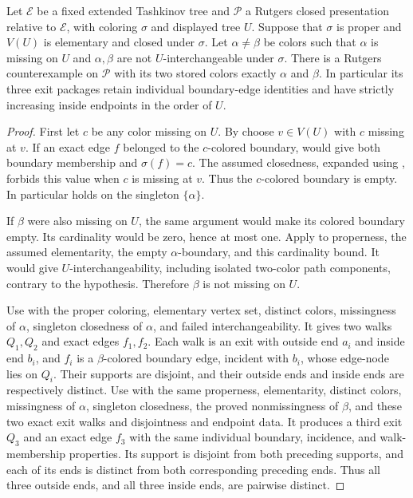 \begin{lemma}
Let $\mathcal E$ be a fixed extended Tashkinov tree and $\mathcal P$ a
Rutgers closed presentation relative to $\mathcal E$, with coloring
$\sigma$ and displayed tree $U$. Suppose that $\sigma$ is proper and
$V(U)$ is elementary and closed under $\sigma$. Let $\alpha\ne\beta$
be colors such that $\alpha$ is missing on $U$ and $\alpha,\beta$ are
not $U$-interchangeable under $\sigma$. There is a Rutgers counterexample
on $\mathcal P$ with its two stored colors exactly $\alpha$ and $\beta$.
In particular its three exit packages retain individual boundary-edge
identities and have strictly increasing inside endpoints in the order of
$U$.
\end{lemma}
\begin{proof}
First let $c$ be any color missing on $U$. By 
choose $v\in V(U)$ with $c$ missing at $v$. If an exact edge $f$ belonged
to the $c$-colored boundary,  would give both
boundary membership and $\sigma(f)=c$. The assumed closedness, expanded
using , forbids this value when $c$ is
missing at $v$. Thus the $c$-colored boundary is empty. In particular
 holds on the singleton $\{\alpha\}$.

If $\beta$ were also missing on $U$, the same argument would make its
colored boundary empty. Its cardinality would be zero, hence at most
one. Apply  to
properness, the assumed elementarity, the empty $\alpha$-boundary, and
this cardinality bound. It would give $U$-interchangeability, including
isolated two-color path components, contrary to the hypothesis.
Therefore $\beta$ is not missing on $U$.

Use  with the
proper coloring, elementary vertex set, distinct colors, missingness of
$\alpha$, singleton closedness of $\alpha$, and failed interchangeability.
It gives two walks $Q_1,Q_2$ and exact edges $f_1,f_2$. Each walk is an
exit with outside end $a_i$ and inside end $b_i$, and $f_i$ is a
$\beta$-colored boundary edge, incident with $b_i$, whose edge-node lies
on $Q_i$. Their supports are disjoint, and their outside ends and inside
ends are respectively distinct. Use
 with the same properness,
elementarity, distinct colors, missingness of $\alpha$, singleton
closedness, the proved nonmissingness of $\beta$, and these two exact
exit walks and disjointness and endpoint data. It produces a third
exit $Q_3$ and an exact edge $f_3$ with the same individual boundary,
incidence, and walk-membership properties. Its support is disjoint from
both preceding supports, and each of its ends is distinct from both
corresponding preceding ends. Thus all three outside ends, and all three
inside ends, are pairwise distinct.


\end{proof}
